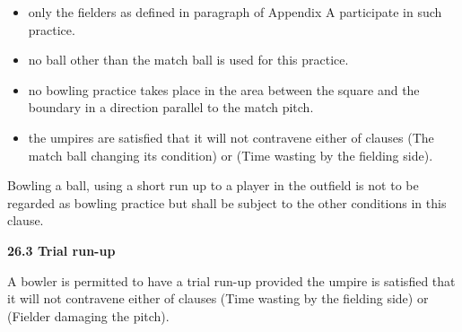 \documentclass[12pt]{article}
\begin{document}
\vspace{\baselineskip}
\begin{itemize}
	\item {\fontsize{9pt}{10.8pt}\selectfont only the fielders as defined in paragraph of Appendix A participate in such practice.\par}\par


\vspace{\baselineskip}
	\item {\fontsize{9pt}{10.8pt}\selectfont no ball other than the match ball is used for this practice.\par}\par


\vspace{\baselineskip}
	\item {\fontsize{9pt}{10.8pt}\selectfont no bowling practice takes place in the area between the square and the boundary in a direction parallel to the match pitch.\par}\par


\vspace{\baselineskip}
	\item {\fontsize{9pt}{10.8pt}\selectfont the umpires are satisfied that it will not contravene either of clauses (The match ball changing its condition) or (Time wasting by the fielding side).\par}
\end{itemize}\par


\vspace{\baselineskip}
\begin{adjustwidth}{0.5in}{0.18in}
{\fontsize{9pt}{10.8pt}\selectfont Bowling a ball, using a short run up to a player in the outfield is not to be regarded as bowling practice but shall be subject to the other conditions in this clause.\par}\par

\end{adjustwidth}


\vspace{\baselineskip}
{\fontsize{11pt}{13.2pt}\selectfont \textbf{26.3 \tabto{0.47in} Trial run-up}\par}\par


\vspace{\baselineskip}
\begin{adjustwidth}{0.0in}{0.04in}
{\fontsize{9pt}{10.8pt}\selectfont A bowler is permitted to have a trial run-up provided the umpire is satisfied that it will not contravene either of clauses (Time wasting by the fielding side) or (Fielder damaging the pitch).\par}\par

\end{adjustwidth}
\end{document}
